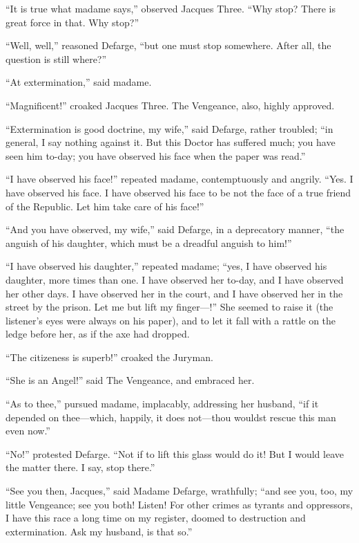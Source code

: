 ``It is true what madame says,'' observed Jacques Three.  ``Why stop?
There is great force in that.  Why stop?''

``Well, well,'' reasoned Defarge, ``but one must stop somewhere.
After all, the question is still where?''

``At extermination,'' said madame.

``Magnificent!'' croaked Jacques Three.  The Vengeance, also, highly approved.

``Extermination is good doctrine, my wife,'' said Defarge, rather
troubled; ``in general, I say nothing against it.  But this Doctor has
suffered much; you have seen him to-day; you have observed his face
when the paper was read.''

``I have observed his face!'' repeated madame, contemptuously and
angrily.  ``Yes.  I have observed his face.  I have observed his face
to be not the face of a true friend of the Republic.  Let him take
care of his face!''

``And you have observed, my wife,'' said Defarge, in a deprecatory
manner, ``the anguish of his daughter, which must be a dreadful
anguish to him!''

``I have observed his daughter,'' repeated madame; ``yes, I have
observed his daughter, more times than one.  I have observed her
to-day, and I have observed her other days.  I have observed her
in the court, and I have observed her in the street by the prison.
Let me but lift my finger---!''  She seemed to raise it (the listener's
eyes were always on his paper), and to let it fall with a rattle on
the ledge before her, as if the axe had dropped.

``The citizeness is superb!'' croaked the Juryman.

``She is an Angel!'' said The Vengeance, and embraced her.

``As to thee,'' pursued madame, implacably, addressing her husband,
``if it depended on thee---which, happily, it does not---thou wouldst
rescue this man even now.''

``No!'' protested Defarge.  ``Not if to lift this glass would do it!
But I would leave the matter there.  I say, stop there.''

``See you then, Jacques,'' said Madame Defarge, wrathfully; ``and see
you, too, my little Vengeance; see you both!  Listen!  For other crimes
as tyrants and oppressors, I have this race a long time on my register,
doomed to destruction and extermination.  Ask my husband, is that so.''

